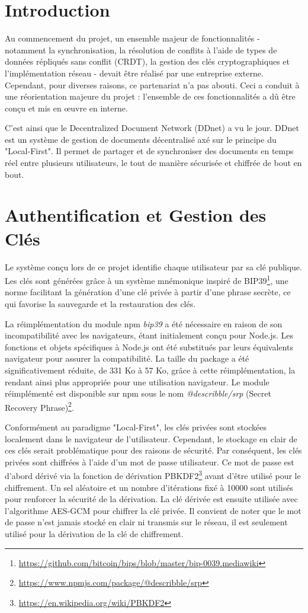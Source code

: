 \section{Introduction}

Au commencement du projet, un ensemble majeur de fonctionnalités - notamment la synchronisation, la résolution de conflits à l'aide de types de données répliqués sans conflit (CRDT), la gestion des clés cryptographiques et l'implémentation réseau - devait être réalisé par une entreprise externe. Cependant, pour diverses raisons, ce partenariat n'a pas abouti. Ceci a conduit à une réorientation majeure du projet : l'ensemble de ces fonctionnalités a dû être conçu et mis en œuvre en interne.

C'est ainsi que le Decentralized Document Network (DDnet) a vu le jour. DDnet est un système de gestion de documents décentralisé axé sur le principe du "Local-First". Il permet de partager et de synchroniser des documents en temps réel entre plusieurs utilisateurs, le tout de manière sécurisée et chiffrée de bout en bout.

\section{Authentification et Gestion des Clés}

Le système conçu lors de ce projet identifie chaque utilisateur par sa clé publique. Les clés sont générées grâce à un système mnémonique inspiré de BIP39\footnote{\url{https://github.com/bitcoin/bips/blob/master/bip-0039.mediawiki}}, une norme facilitant la génération d'une clé privée à partir d'une phrase secrète, ce qui favorise la sauvegarde et la restauration des clés.

La réimplémentation du module npm \textit{bip39} a été nécessaire en raison de son incompatibilité avec les navigateurs, étant initialement conçu pour Node.js. Les fonctions et objets spécifiques à Node.js ont été substitués par leurs équivalents navigateur pour assurer la compatibilité. La taille du package a été significativement réduite, de 331 Ko à 57 Ko, grâce à cette réimplémentation, la rendant ainsi plus appropriée pour une utilisation navigateur. Le module réimplémenté est disponible sur npm sous le nom \textit{@describble/srp} (Secret Recovery Phrase)\footnote{\url{https://www.npmjs.com/package/@describble/srp}}.

Conformément au paradigme "Local-First", les clés privées sont stockées localement dans le navigateur de l'utilisateur. Cependant, le stockage en clair de ces clés serait problématique pour des raisons de sécurité. Par conséquent, les clés privées sont chiffrées à l'aide d'un mot de passe utilisateur. Ce mot de passe est d'abord dérivé via la fonction de dérivation PBKDF2\footnote{\url{https://en.wikipedia.org/wiki/PBKDF2}} avant d'être utilisé pour le chiffrement. Un sel aléatoire et un nombre d'itérations fixé à 10000 sont utilisés pour renforcer la sécurité de la dérivation. La clé dérivée est ensuite utilisée avec l'algorithme AES-GCM pour chiffrer la clé privée. Il convient de noter que le mot de passe n'est jamais stocké en clair ni transmis sur le réseau, il est seulement utilisé pour la dérivation de la clé de chiffrement.


